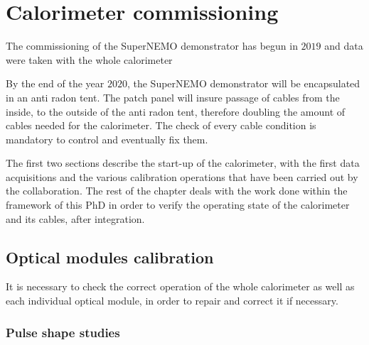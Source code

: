 \chapter{Calorimeter commissioning}
\label{ch:commissioning}


The commissioning of the SuperNEMO demonstrator has begun in $2019$ and data were taken with the whole calorimeter

By the end of the year $2020$, the SuperNEMO demonstrator will be encapsulated in an anti radon tent.
The patch panel will insure passage of cables from the inside, to the outside of the anti radon tent, therefore doubling the amount of cables needed for the calorimeter.
The check of every cable condition is mandatory to control and eventually fix them.

The first two sections describe the start-up of the calorimeter, with the first data acquisitions and the various calibration operations that have been carried out by the collaboration.
The rest of the chapter deals with the work done within the framework of this PhD in order to verify the operating state of the calorimeter and its cables, after integration.


\section{Optical modules calibration}

It is necessary to check the correct operation of the whole calorimeter as well as each individual optical module, in order to repair and correct it if necessary.

\subsection{Pulse shape studies}

